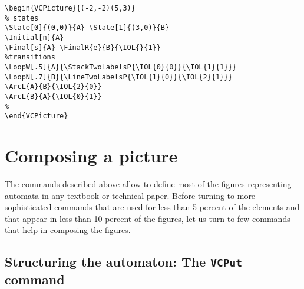 \documentclass[11pt,twoside]{article}
\newlength{\parindenttemp} %
\newcommand{\noi}{\noindent}
\newlength{\jsIndent}%
\newlength{\ColSource}%
\newlength{\ColFigur}%
\begin{document}
\noi 
\hspace*{-\jsIndent}
\begin{minipage}[c]{\ColFigur}%
\par\vspace*{0mm}%
\begin{center}
%
\end{center}
\end{minipage}%
\hspace*{1.2em}%
\begin{minipage}[c]{\ColSource}
\setlength{\parindent}{\parindenttemp}%
\par\vspace*{0mm}%
\footnotesize
\begin{verbatim}
\begin{VCPicture}{(-2,-2)(5,3)}
% states
\State[0]{(0,0)}{A} \State[1]{(3,0)}{B}
\Initial[n]{A}
\Final[s]{A} \FinalR{e}{B}{\IOL{}{1}}
%transitions 
\LoopW[.5]{A}{\StackTwoLabelsP{\IOL{0}{0}}{\IOL{1}{1}}}
\LoopN[.7]{B}{\LineTwoLabelsP{\IOL{1}{0}}{\IOL{2}{1}}}
\ArcL{A}{B}{\IOL{2}{0}}
\ArcL{B}{A}{\IOL{0}{1}}
%
\end{VCPicture}
\end{verbatim}
\normalsize
\end{minipage}%

\section{Composing a picture}\label{sec.com}

The commands described above allow to define most of the figures 
representing automata in any textbook or technical paper.
Before turning to more sophisticated commands that are used 
for less than 5 percent of the elements and that appear in less than 
10 percent of the figures, let us turn to few commands that help in 
composing the figures.


\subsection{Structuring the automaton: The \texttt{VCPut} command}\label{subsec.rpu}
\end{document}
